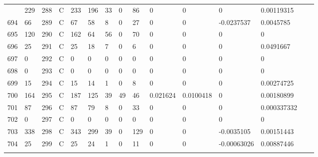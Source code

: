 \begin{longtable}{lllllllllllllll}
\begin{comment}
	693 & 229               & 288 & C   & 233               & 196               & 33                & 0    & 86         & 0              & 0              & 0             & 0.00119315   \\
	694 & 66                & 289 & C   & 67                & 58                & 8                 & 0    & 27         & 0              & 0              & -0.0237537    & 0.0045785    \\
	695 & 120               & 290 & C   & 162               & 64                & 56                & 0    & 70         & 0              & 0              & 0             & 0            \\
	696 & 25                & 291 & C   & 25                & 18                & 7                 & 0    & 6          & 0              & 0              & 0             & 0.0491667    \\
	697 & 0                 & 292 & C   & 0                 & 0                 & 0                 & 0    & 0          & 0              & 0              & 0             & 0            \\
	698 & 0                 & 293 & C   & 0                 & 0                 & 0                 & 0    & 0          & 0              & 0              & 0             & 0            \\
	699 & 15                & 294 & C   & 15                & 14                & 1                 & 0    & 8          & 0              & 0              & 0             & 0.00274725   \\
	700 & 164               & 295 & C   & 187               & 125               & 39                & 49   & 46         & 0.021624       & 0.0100418      & 0             & 0.00180899   \\
	701 & 87                & 296 & C   & 87                & 79                & 8                 & 0    & 33         & 0              & 0              & 0             & 0.000337332  \\
	702 & 0                 & 297 & C   & 0                 & 0                 & 0                 & 0    & 0          & 0              & 0              & 0             & 0            \\
	703 & 338               & 298 & C   & 343               & 299               & 39                & 0    & 129        & 0              & 0              & -0.0035105    & 0.00151443   \\
	704 & 25                & 299 & C   & 25                & 24                & 1                 & 0    & 11         & 0              & 0              & -0.00063026   & 0.00887446   \\

\end{comment}
\end{longtable}
